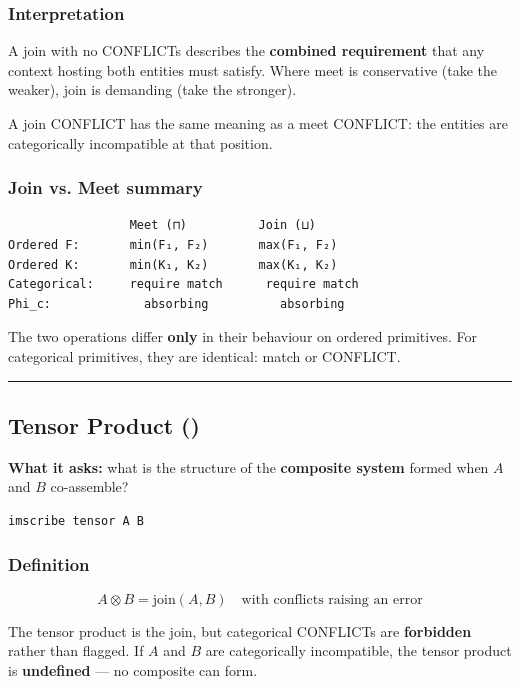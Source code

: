 \documentclass[12pt,a4paper]{article}
\begin{document}
\subsubsection{Interpretation}

A join with no CONFLICTs describes the \textbf{combined requirement} that any context hosting both entities must satisfy. Where meet is conservative (take the weaker), join is demanding (take the stronger).

A join CONFLICT has the same meaning as a meet CONFLICT: the entities are categorically incompatible at that position.

\subsubsection{Join vs. Meet summary}

\begin{lstlisting}
                 Meet (⊓)          Join (⊔)
Ordered F:       min(F₁, F₂)       max(F₁, F₂)
Ordered K:       min(K₁, K₂)       max(K₁, K₂)
Categorical:     require match      require match
Phi_c:             absorbing          absorbing
\end{lstlisting}

The two operations differ \textbf{only} in their behaviour on ordered primitives. For categorical primitives, they are identical: match or CONFLICT.

\begin{center}
\rule{0.5\textwidth}{0.4pt}
\end{center}

\subsection{Tensor Product (\otimes)}

\textbf{What it asks:} what is the structure of the \textbf{composite system} formed when $A$ and $B$ co-assemble?

\begin{lstlisting}
imscribe tensor A B
\end{lstlisting}

\subsubsection{Definition}

\[A \otimes B = \text{join}(A, B) \quad \text{with conflicts raising an error}\]

The tensor product is the join, but categorical CONFLICTs are \textbf{forbidden} rather than flagged. If $A$ and $B$ are categorically incompatible, the tensor product is \textbf{undefined} --- no composite can form.
\end{document}
